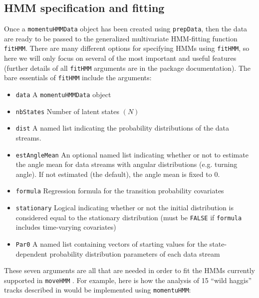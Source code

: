 \documentclass[12pt]{article}\usepackage[]{graphicx}\usepackage[]{xcolor}
\begin{document}
\subsection{HMM specification and fitting}
Once a \verb|momentuHMMData| object has been created using \verb|prepData|, then the data are ready to be passed to the generalized multivariate HMM-fitting function \verb|fitHMM|. There are many different options for specifying HMMs using \verb|fitHMM|, so here we will only focus on several of the most important and useful features (further details of all \verb|fitHMM| arguments are in the package documentation). The bare essentials of \verb|fitHMM| include the arguments:
\begin{itemize}
  \item{\verb|data|} A \verb|momentuHMMData| object
  \item{\verb|nbStates|} Number of latent states $(N)$
  \item{\verb|dist|} A named list indicating the probability distributions of the data streams.
  \item{\verb|estAngleMean|} An optional named list indicating whether or not to estimate the angle mean for data streams with angular distributions (e.g. turning angle). If not estimated (the default), the angle mean is fixed to 0.
  \item{\verb|formula|} Regression formula for the transition probability covariates
  \item{\verb|stationary|} Logical indicating whether or not the initial distribution is considered equal to the stationary distribution (must be \verb|FALSE| if \verb|formula| includes time-varying covariates) 
  \item{\verb|Par0|} A named list containing vectors of starting values for the state-dependent probability distribution parameters of each data stream
\end{itemize}
These seven arguments are all that are needed in order to fit the HMMs currently supported in \verb|moveHMM| \citep{MichelotEtAl2016}. For example, here is how the analysis of 15 ``wild haggis'' tracks described in \cite{MichelotEtAl2016} would be implemented using \verb|momentuHMM|:
\end{document}
